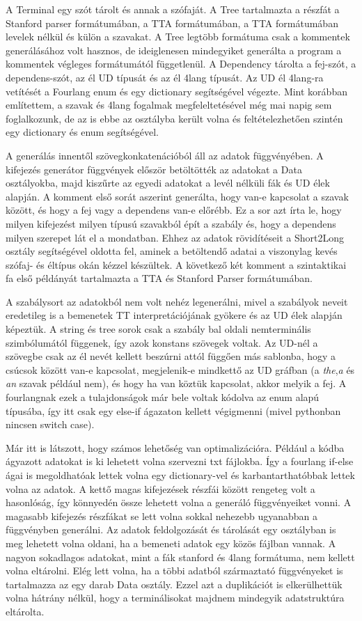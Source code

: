 A Terminal egy szót tárolt és annak a szófaját. A Tree tartalmazta a részfát a Stanford parser formátumában, a TTA formátumában, a TTA formátumában levelek nélkül és külön a szavakat. A Tree legtöbb formátuma csak a kommentek generálásához volt hasznos, de ideiglenesen mindegyiket generálta a program a kommentek végleges formátumától függetlenül. A Dependency tárolta a fej-szót, a dependens-szót, az él UD típusát és az él 4lang típusát. Az UD él 4lang-ra vetítését a Fourlang enum és egy dictionary segítségével végezte. Mint korábban említettem, a szavak és 4lang fogalmak megfeleltetésével még mai napig sem foglalkozunk, de az is ebbe az osztályba került volna és feltételezhetően szintén egy dictionary és enum segítségével.

A generálás innentől szövegkonkatenációból áll az adatok függvényében.
A kifejezés generátor függvények először betöltötték az adatokat a Data osztályokba, majd kiszűrte az egyedi adatokat a levél nélküli fák és UD élek alapján. A komment első sorát aszerint generálta, hogy van-e kapcsolat a szavak között, és hogy a fej vagy a dependens van-e  előrébb. Ez a sor azt írta le, hogy milyen kifejezést milyen típusú szavakból épít a szabály és, hogy a dependens milyen szerepet lát el a mondatban. Ehhez az adatok rövidítéseit a Short2Long osztály segítségével oldotta fel, aminek a betöltendő adatai  a viszonylag kevés szófaj- és éltípus okán kézzel készültek. A következő két komment a szintaktikai fa első példányát tartalmazta a TTA és Stanford Parser formátumában. 

A szabálysort az adatokból nem volt nehéz legenerálni, mivel a szabályok neveit eredetileg is a bemenetek TT interpretációjának gyökere és az UD élek alapján képeztük. A string és tree sorok csak a szabály bal oldali nemterminális szimbólumától függenek, így azok konstans szövegek voltak. Az UD-nél a szövegbe csak az él nevét kellett beszúrni attól függően más sablonba, hogy a csúcsok között van-e kapcsolat, megjelenik-e mindkettő az UD gráfban (a \textit{the},\textit{a} és \textit{an} szavak például nem), és hogy ha van köztük kapcsolat, akkor melyik a fej. A fourlangnak ezek a tulajdonságok már bele voltak kódolva az enum alapú típusába, így itt csak egy else-if ágazaton kellett végigmenni (mivel pythonban nincsen switch case).

Már itt is látszott, hogy számos lehetőség van optimalizációra. Például a kódba ágyazott adatokat is ki lehetett volna szervezni txt fájlokba. Így a fourlang if-else ágai is megoldhatóak lettek volna egy dictionary-vel és karbantarthatóbbak lettek volna az adatok. A kettő magas kifejezések részfái között rengeteg volt a hasonlóság, így könnyedén össze lehetett volna a generáló függvényeiket vonni. A magasabb kifejezés részfákat se lett volna sokkal nehezebb ugyanabban a függvényben generálni. Az adatok feldolgozását és tárolását egy osztályban is meg lehetett volna oldani, ha a bemeneti adatok egy közös fájlban vannak. A nagyon sokadlagos adatokat, mint a fák stanford és 4lang formátuma, nem kellett volna eltárolni. Elég lett volna, ha a többi adatból származtató függvényeket is tartalmazza az egy darab Data osztály. Ezzel azt a duplikációt is elkerülhettük volna hátrány nélkül, hogy a terminálisokat majdnem mindegyik adatstruktúra eltárolta.

